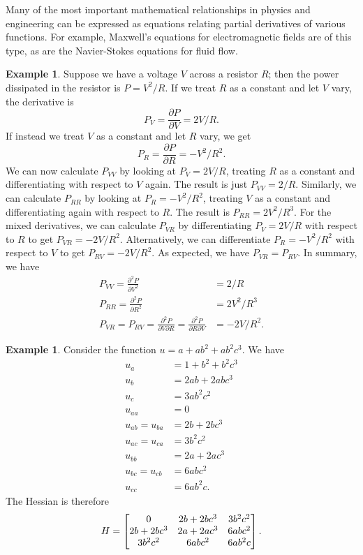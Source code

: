 \documentclass[reqno]{amsart}
\theoremstyle{definition}
\newtheorem{example}[theorem]{Example}
\begin{document}
Many of the most important mathematical relationships in physics and
engineering can be expressed as equations relating partial derivatives
of various functions.  For example, Maxwell's equations for
electromagnetic fields are of this type, as are the Navier-Stokes
equations for fluid flow.

\begin{example}
 Suppose we have a voltage $V$ across a resistor $R$; then the power
 dissipated in the resistor is $P=V^2/R$.  If we treat $R$ as a
 constant and let $V$ vary, the derivative is
 \[ P_V = \frac{\partial P}{\partial V} = 2V/R. \]
 If instead we treat $V$ as a constant and let $R$ vary, we get
 \[ P_R = \frac{\partial P}{\partial R} = -V^2/R^2. \]
 We can now calculate $P_{VV}$ by looking at $P_V=2V/R$, treating $R$
 as a constant and differentiating with respect to $V$ again.  The
 result is just $P_{VV}=2/R$.  Similarly, we can calculate $P_{RR}$ by
 looking at $P_R=-V^2/R^2$, treating $V$ as a constant and
 differentiating again with respect to $R$.  The result is
 $P_{RR}=2V^2/R^3$.  For the mixed derivatives, we can calculate
 $P_{VR}$ by differentiating $P_V=2V/R$ with respect to $R$ to get
 $P_{VR}=-2V/R^2$.  Alternatively, we can differentiate $P_R=-V^2/R^2$
 with respect to $V$ to get $P_{RV}=-2V/R^2$.  As expected, we have
 $P_{VR}=P_{RV}$.  In summary, we have
 \begin{align*}
  P_{VV} = \frac{\partial^2P}{\partial V^2} &= 2/R \\
  P_{RR} = \frac{\partial^2P}{\partial R^2} &= 2V^2/R^3 \\
  P_{VR}=P_{RV}
   =\frac{\partial^2P}{\partial V\partial R} 
   =\frac{\partial^2P}{\partial R\partial V} &= -2V/R^2. 
 \end{align*}
\end{example}
\begin{example}
 Consider the function $u=a+ab^2+ab^2c^3$.  We have
 \begin{align*}
  u_a &= 1+b^2+b^2c^3 \\
  u_b &= 2ab+2abc^3 \\
  u_c &= 3ab^2c^2 \\
  u_{aa}          &= 0 \\
  u_{ab} = u_{ba} &= 2b+2bc^3 \\
  u_{ac} = u_{ca} &= 3b^2c^2 \\
  u_{bb}          &= 2a+2ac^3 \\
  u_{bc} = u_{cb} &= 6abc^2 \\
  u_{cc}          &= 6ab^2c.
 \end{align*}
 The Hessian is therefore
 \[ H = \left[\begin{matrix} 0        & 2b+2bc^3 & 3b^2c^2 \\
             2b+2bc^3 & 2a+2ac^3 & 6abc^2  \\
             3b^2c^2  & 6abc^2   & 6ab^2c \end{matrix}\right]. 
 \]
\end{example}
\end{document}
